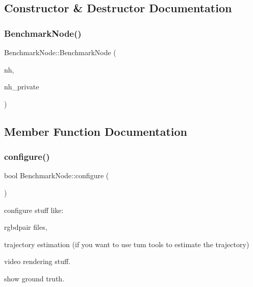 \subsection{Constructor \& Destructor Documentation}
\mbox{\label{class_benchmark_node_ad4ee7b497428bce6426add3c4010200e}} 
\subsubsection{\texorpdfstring{Benchmark\+Node()}{BenchmarkNode()}}
{\footnotesize\ttfamily Benchmark\+Node\+::\+Benchmark\+Node (\begin{DoxyParamCaption}\item[{ros\+::\+Node\+Handle \&}]{nh,  }\item[{ros\+::\+Node\+Handle \&}]{nh\+\_\+private }\end{DoxyParamCaption})}



\subsection{Member Function Documentation}
\mbox{\label{class_benchmark_node_a6fb208304f873fb46988f6ca4ed0b9d8}} 
\subsubsection{\texorpdfstring{configure()}{configure()}}
{\footnotesize\ttfamily bool Benchmark\+Node\+::configure (\begin{DoxyParamCaption}{ }\end{DoxyParamCaption})}

configure stuff like\+:
\begin{DoxyEnumerate}
\item rgbdpair files,
\item trajectory estimation (if you want to use tum tools to estimate the trajectory)
\item video rendering stuff.
\item show ground truth. 
\end{DoxyEnumerate}\mbox{\label{class_benchmark_node_ac906f068111a96dc95b289d3728df574}} 
